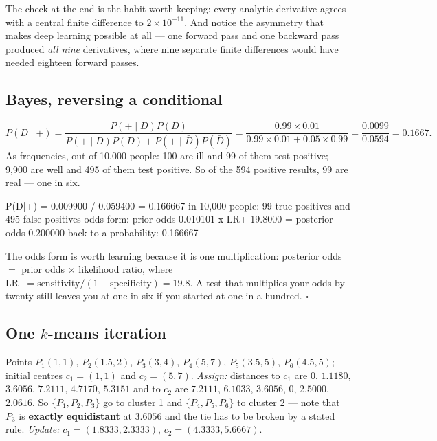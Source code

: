 \documentclass[11pt]{article}
\begin{document}
The check at the end is the habit worth keeping: every analytic derivative
agrees with a central finite difference to $2 \times 10^{-11}$. And notice the
asymmetry that makes deep learning possible at all --- one forward pass and
one backward pass produced \emph{all nine} derivatives, where nine separate
finite differences would have needed eighteen forward passes.

\subsection{Bayes, reversing a conditional}

\begin{worked}
\[
  P(D \mid +) = \frac{P(+ \mid D)P(D)}{P(+ \mid D)P(D) +
                 P(+ \mid \bar D)P(\bar D)}
              = \frac{0.99 \times 0.01}{0.99 \times 0.01 + 0.05 \times 0.99}
              = \frac{0.0099}{0.0594} = 0.1667 .
\]
As frequencies, out of 10{,}000 people: 100 are ill and 99 of them test
positive; 9{,}900 are well and 495 of them test positive. So of the 594
positive results, 99 are real --- one in six.
\end{worked}

\begin{codeout}
P(D|+) = 0.009900 / 0.059400 = 0.166667
in 10,000 people: 99 true positives and 495 false positives
odds form: prior odds 0.010101 x LR+ 19.8000 = posterior odds 0.200000
back to a probability: 0.166667
\end{codeout}

The odds form is worth learning because it is one multiplication:
posterior odds $=$ prior odds $\times$ likelihood ratio, where
$\mathrm{LR}^{+} = \text{sensitivity} / (1 - \text{specificity}) = 19.8$. A
test that multiplies your odds by twenty still leaves you at one in six if
you started at one in a hundred. \ensuremath{\square}

\subsection{One $k$-means iteration}

\begin{worked}[Six points, $k = 2$, one Lloyd step]
Points $P_1(1,1)$, $P_2(1.5,2)$, $P_3(3,4)$, $P_4(5,7)$, $P_5(3.5,5)$,
$P_6(4.5,5)$; initial centres $c_1 = (1,1)$ and $c_2 = (5,7)$.
\emph{Assign:} distances to $c_1$ are $0$, $1.1180$, $3.6056$, $7.2111$,
$4.7170$, $5.3151$ and to $c_2$ are $7.2111$, $6.1033$, $3.6056$, $0$,
$2.5000$, $2.0616$. So $\{P_1,P_2,P_3\}$ go to cluster 1 and
$\{P_4,P_5,P_6\}$ to cluster 2 --- note that $P_3$ is \textbf{exactly
equidistant} at $3.6056$ and the tie has to be broken by a stated rule.
\emph{Update:} $c_1 = (1.8333, 2.3333)$, $c_2 = (4.3333, 5.6667)$.
\end{worked}
\end{document}
